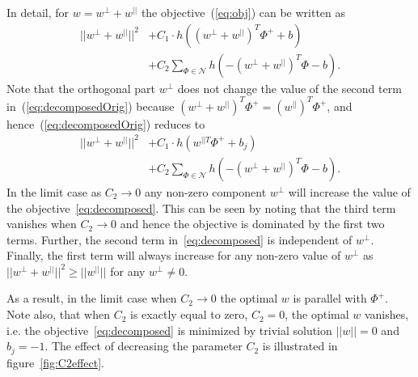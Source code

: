 \documentclass[10pt,twocolumn,letterpaper]{article}
\begin{document}
         In detail, for $w=w^{\perp}+w^{||}$ the objective~(\ref{eq:obj}) can be written as
            \begin{align}
               \label{eq:decomposedOrig}
                 ||w^{\perp}+w^{||}||^{2} &+
                 C_1 \cdot h
                 \left(
                  (w^{\perp}+w^{||})^T\Phi^+ + b
                 \right) \\ \nonumber
                 &+
                 C_2\sum_{\Phi\in \mathcal N} h
                 \left(
                  -(w^{\perp}+w^{||})^T\Phi-b
                 \right).
            \end{align}
         Note that the orthogonal part $w^{\perp}$ does not change the value of  the second term in~(\ref{eq:decomposedOrig}) because $(w^{\perp}+w^{||})^T\Phi^+=(w^{||})^T\Phi^+$, and hence~(\ref{eq:decomposedOrig}) reduces to
            \begin{align} 
               \label{eq:decomposed} 
               ||w^{\perp}+w^{||}||^{2} &+
               C_1 \cdot h
               \left(
                   w^{||T}\Phi^+ +b_j
               \right) \\ \nonumber
               &+
               C_2\sum_{\Phi\in \mathcal N} h
               \left(
                   -(w^{\perp}+w^{||})^T\Phi-b
               \right).
            \end{align}
         In the limit case as $C_2 \rightarrow 0$ any non-zero component $w^{\perp}$
         will increase the value of the objective~\eqref{eq:decomposed}. This can be seen by noting that the third term vanishes when $C_2 \rightarrow 0$ and hence the objective is dominated by the first two terms. Further, the second term in~\eqref{eq:decomposed} is independent of $w^{\perp}$. Finally, the first term will always increase for any non-zero value of $w^{\perp}$ as $||w^{\perp}+w^{||}||^{2} \geq ||w^{||}||$ for any $w^{\perp}\neq0$.

         As a result, in the limit case when $C_2 \rightarrow 0$ the optimal $w$ is parallel with $\Phi^+$. Note also, that when $C_2$ is exactly equal to zero, $C_2=0$, the optimal $w$ vanishes, i.e. the objective~\eqref{eq:decomposed} is minimized by trivial solution $||w||=0$ and $b_j=-1$. The effect of decreasing the parameter $C_2$ is illustrated in figure~\ref{fig:C2effect}.
\end{document}
